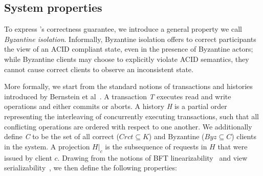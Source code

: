 \subsection{System properties}
To express \sys's correctness guarantee, we introduce a general property we call  {\em Byzantine isolation}. Informally, Byzantine isolation offers to correct participants the view of an ACID compliant state, even in the presence of Byzantine actors;  while Byzantine clients may choose to explicitly violate ACID semantics, they cannot cause correct clients to observe an inconsistent state.  


 More formally, we start from the standard notions of transactions and histories introduced by Bernstein et al~\cite{bernstein1987concurrency}. A transaction \textit{T} executes read and write operations and either commits or aborts. A history \textit{H} is a partial order representing the interleaving of concurrently executing transactions, such that all conflicting operations are ordered with respect to one another. We additionally define \textit{C} to be the set of all correct ($Crct \subseteq K$) and Byzantine ($Byz \subseteq C$) clients in the system.
A projection $H|_{c}$ is the subsequence of requests in $H$ that were issued by client $c$. Drawing from the notions of BFT linearizability~\cite{liskov2006tolerating} and view serializability~\cite{bernstein1987concurrency}, we then define the following properties:



